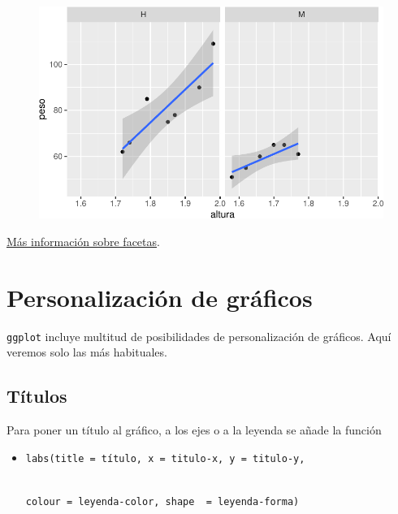 \documentclass[
  a4paper,
]{scrreport}
\providecommand{\tightlist}{%
  \setlength{\itemsep}{0pt}\setlength{\parskip}{0pt}}\usepackage{longtable,booktabs,array}
\theoremstyle{definition}
\theoremstyle{definition}
\theoremstyle{remark}
\begin{document}
\begin{figure}[H]

{\centering \includegraphics{07-graficos_files/figure-pdf/unnamed-chunk-27-1.pdf}

}

\end{figure}

\href{https://ggplot2.tidyverse.org/reference/facet_wrap.html?q=facet_wrap}{Más
información sobre facetas}.

\hypertarget{personalizaciuxf3n-de-gruxe1ficos}{%
\section{Personalización de
gráficos}\label{personalizaciuxf3n-de-gruxe1ficos}}

\texttt{ggplot} incluye multitud de posibilidades de personalización de
gráficos. Aquí veremos solo las más habituales.

\hypertarget{tuxedtulos}{%
\subsection{Títulos}\label{tuxedtulos}}

Para poner un título al gráfico, a los ejes o a la leyenda se añade la
función

\begin{itemize}
\tightlist
\item
  \texttt{labs(title\ =\ título,\ x\ =\ titulo-x,\ y\ =\ titulo-y,}\strut \\
  \texttt{colour\ =\ leyenda-color,\ shape\ \ =\ leyenda-forma)}
\end{itemize}
\end{document}
